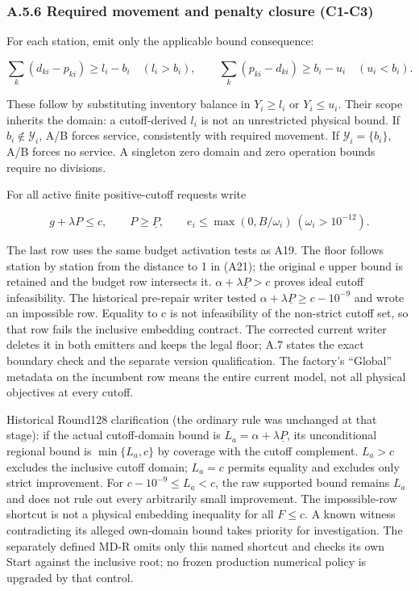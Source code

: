 \documentclass[
  american,
  11pt,
]{article}
\begin{document}
\subsubsection{A.5.6 Required movement and penalty closure
(C1-C3)}\label{a.5.6-required-movement-and-penalty-closure-c1-c3}

For each station, emit only the applicable bound consequence:

\[
\sum_k(d_{ki}-p_{ki})\ge l_i-b_i\quad(l_i>b_i),\qquad
\sum_k(p_{ki}-d_{ki})\ge b_i-u_i\quad(u_i<b_i).
\tag{A31}
\]

These follow by substituting inventory balance in \(Y_i\ge l_i\) or
\(Y_i\le u_i\). Their scope inherits the domain: a cutoff-derived
\(l_i\) is not an unrestricted physical bound. If
\(b_i\notin\mathcal Y_i\), A/B forces service, consistently with
required movement. If \(\mathcal Y_i=\{b_i\}\), A/B forces no service. A
singleton zero domain and zero operation bounds require no divisions.

For all active finite positive-cutoff requests write

\[
g+\lambda P\le c,\qquad P\ge\underline P,\qquad
e_i\le\max(0,B/\omega_i)\ (\omega_i>10^{-12}).
\tag{A32}
\]

The last row uses the same budget activation tests as A19. The floor
follows station by station from the distance to 1 in (A21); the original
e upper bound is retained and the budget row intersects it.
\(\alpha+\lambda\underline P>c\) proves ideal cutoff infeasibility. The
historical pre-repair writer tested
\(\alpha+\lambda\underline P\ge c-10^{-9}\) and wrote an impossible row.
Equality to c is not infeasibility of the non-strict cutoff set, so that
row fails the inclusive embedding contract. The corrected current writer
deletes it in both emitters and keeps the legal floor; A.7 states the
exact boundary check and the separate version qualification. The
factory's ``Global'' metadata on the incumbent row means the entire
current model, not all physical objectives at every cutoff.

Historical Round128 clarification (the ordinary rule was unchanged at
that stage): if the actual cutoff-domain bound is
\(L_a=\alpha+\lambda\underline P\), its unconditional regional bound is
\(\min\{L_a,c\}\) by coverage with the cutoff complement. \(L_a>c\)
excludes the inclusive cutoff domain; \(L_a=c\) permits equality and
excludes only strict improvement. For \(c-10^{-9}\le L_a<c\), the raw
supported bound remains \(L_a\) and does not rule out every arbitrarily
small improvement. The impossible-row shortcut is not a physical
embedding inequality for all \(F\le c\). A known witness contradicting
its alleged own-domain bound takes priority for investigation. The
separately defined MD-R omits only this named shortcut and checks its
own Start against the inclusive root; no frozen production numerical
policy is upgraded by that control.
\end{document}
